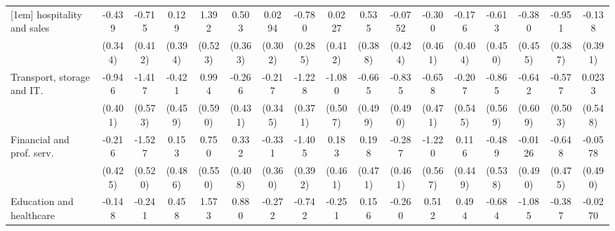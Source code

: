 {\begin{tabular}{l*{16}{c}}
[1em]
hospitality and sales&      -0.439         &      -0.715         &       0.129         &       1.392\sym{**} &       0.503         &      0.0294         &      -0.780\sym{**} &      0.0227         &       0.535         &     -0.0752         &      -0.300         &      -0.176         &      -0.613         &      -0.380         &      -0.951\sym{*}  &      -0.138         \\
                    &     (0.344)         &     (0.412)         &     (0.394)         &     (0.523)         &     (0.363)         &     (0.302)         &     (0.285)         &     (0.412)         &     (0.388)         &     (0.424)         &     (0.461)         &     (0.404)         &     (0.450)         &     (0.455)         &     (0.387)         &     (0.391)         \\
[1em]
Transport, storage and IT.&      -0.946\sym{*}  &      -1.417\sym{*}  &      -0.421         &       0.994         &      -0.266         &      -0.217         &      -1.228\sym{***}&      -1.080\sym{*}  &      -0.665         &      -0.835         &      -0.658         &      -0.207         &      -0.865         &      -0.642         &      -0.577         &      0.0233         \\
                    &     (0.401)         &     (0.573)         &     (0.459)         &     (0.590)         &     (0.431)         &     (0.345)         &     (0.371)         &     (0.507)         &     (0.499)         &     (0.490)         &     (0.471)         &     (0.545)         &     (0.569)         &     (0.609)         &     (0.503)         &     (0.548)         \\
[1em]
Financial and prof. serv.&      -0.216         &      -1.527\sym{**} &       0.153         &       0.750         &       0.332         &      -0.331         &      -1.405\sym{***}&       0.183         &       0.198         &      -0.287         &      -1.220\sym{*}  &       0.116         &      -0.489         &     -0.0126         &      -0.648         &     -0.0578         \\
                    &     (0.425)         &     (0.520)         &     (0.486)         &     (0.550)         &     (0.408)         &     (0.360)         &     (0.392)         &     (0.461)         &     (0.471)         &     (0.461)         &     (0.567)         &     (0.449)         &     (0.538)         &     (0.490)         &     (0.475)         &     (0.490)         \\
[1em]
Education and healthcare&      -0.148         &      -0.241         &       0.458         &       1.573\sym{**} &       0.880\sym{*}  &      -0.272         &      -0.742         &      -0.251         &       0.156         &      -0.260         &       0.512         &       0.494         &      -0.684         &      -1.085\sym{*}  &      -0.387         &     -0.0270         \\

\end{tabular}}
